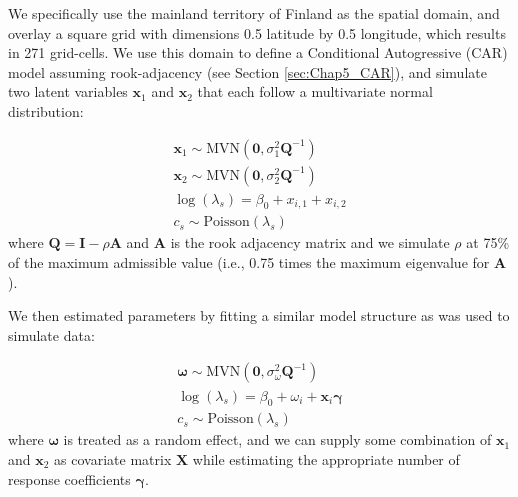 We specifically use the mainland territory of Finland as the spatial domain, and overlay a square grid with dimensions 0.5 latitude by 0.5 longitude, which results in 271 grid-cells.  We use this domain to define a Conditional Autogressive (CAR) model assuming rook-adjacency (see Section \ref{sec:Chap5_CAR}), and simulate two latent variables \(\mathbf{x}_1\) and  \(\mathbf{x}_2\) that each follow a multivariate normal distribution:  

\begin{equation}
\begin{gathered}
  \mathbf{x}_1 \sim \mathrm{MVN}(\mathbf{0}, \sigma_1^2 \mathbf{Q}^{-1} ) \\
  \mathbf{x}_2 \sim \mathrm{MVN}(\mathbf{0}, \sigma_2^2 \mathbf{Q}^{-1} ) \\
  \log(\lambda_s) = \beta_0 + x_{i,1} + x_{i,2} \\
  c_s \sim \mathrm{Poisson}( \lambda_s )
\end{gathered}
\end{equation}
where \( \mathbf{Q} = \mathbf{I} - \rho \mathbf{A} \) and \(\mathbf{A}\) is the rook adjacency matrix and we simulate \(\rho\) at 75\% of the maximum admissible value (i.e., 0.75 times the maximum eigenvalue for \(\mathbf{A}\)).

We then estimated parameters by fitting a similar model structure as was used to simulate data:

\begin{equation}
\begin{gathered}
  \mathbf{\omega} \sim \mathrm{MVN}(\mathbf{0}, \sigma_{\omega}^2 \mathbf{Q}^{-1} ) \\
  \log(\lambda_s) = \beta_0 + \omega_{i} + \mathbf{x}_{i} \mathbf{\gamma} \\
  c_s \sim \mathrm{Poisson}( \lambda_s )
\end{gathered}
\end{equation}
where \(\mathbf{\omega}\) is treated as a random effect, and we can supply some combination of \(\mathbf{x}_1\) and \(\mathbf{x}_2\) as covariate matrix \(\mathbf{X}\) while estimating the appropriate number of response coefficients \(\mathbf{\gamma}\).

